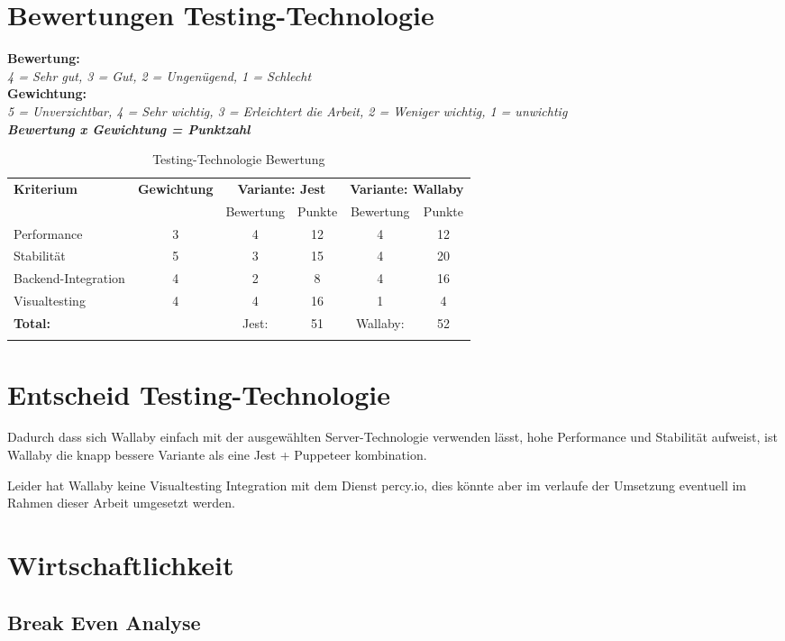 \clearpage
\section{Bewertungen Testing-Technologie}\label{bewertungen-testing-technologie}

\textbf{Bewertung:}\\
\textit{4 = Sehr gut, 3 = Gut, 2 = Ungenügend, 1 = Schlecht}\\
\textbf{Gewichtung:}\\
\textit{5 = Unverzichtbar, 4 = Sehr wichtig, 3 = Erleichtert die Arbeit, 2 = Weniger wichtig, 1 = unwichtig}\\

\textbf{\textit{Bewertung x Gewichtung = Punktzahl}}

\begin{longtable}[]{@{}p{2cm}ccccc@{}}
  \toprule
  \textbf{Kriterium} & \textbf{Gewichtung} & \multicolumn{2}{c}{\textbf{Variante: Jest}} & \multicolumn{2}{c}{\textbf{Variante: Wallaby}}\tabularnewline
  & & Bewertung & Punkte & Bewertung & Punkte\tabularnewline
  \midrule
  \endhead
  Performance & 3 & 4 & 12 & 4 & 12\tabularnewline
  Stabilität & 5 & 3 & 15 & 4 & 20\tabularnewline
  Backend-Integration & 4 & 2 & 8 & 4 & 16\tabularnewline
  Visualtesting & 4 & 4 & 16 & 1 & 4\tabularnewline
  \midrule
  \textbf{Total:} & & Jest: & 51 & Wallaby: & 52\tabularnewline
  \bottomrule
  \caption{Testing-Technologie Bewertung}
\end{longtable}

\section{Entscheid Testing-Technologie}\label{entscheid-testing-technologie}

Dadurch dass sich Wallaby einfach mit der ausgewählten Server-Technologie
verwenden lässt, hohe Performance und Stabilität aufweist, ist Wallaby die
knapp bessere Variante als eine Jest + Puppeteer kombination.

Leider hat Wallaby keine Visualtesting Integration mit dem Dienst percy.io,
dies könnte aber im verlaufe der Umsetzung eventuell im Rahmen dieser Arbeit
umgesetzt werden.

\clearpage
\section{Wirtschaftlichkeit}\label{wirtschaftlichkeit}

\subsection{Break Even Analyse}\label{break-even-analyse}
